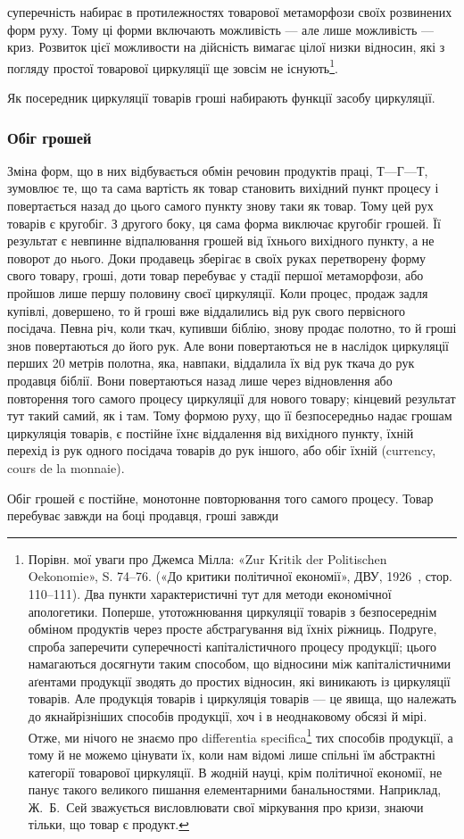 \parcont{}  %
суперечність набирає в протилежностях товарової метаморфози
своїх розвинених форм руху. Тому ці форми включають можливість
— але лише можливість — криз. Розвиток цієї можливости
на дійсність вимагає цілої низки відносин, які з погляду простої
товарової циркуляції ще зовсім не існують\footnote{
Порівн. мої уваги про Джемса Мілла: «Zur Kritik der Politischen
Oekonomie», S. 74--76. («До критики політичної економії», ДВУ, 1926~,
стор. 110--111). Два пункти характеристичні тут для методи економічної
апологетики. Поперше, утотожнювання циркуляції товарів з безпосереднім
обміном продуктів через просте абстрагування від їхніх ріжниць.
Подруге, спроба заперечити суперечності капіталістичного процесу продукції;
цього намагаються досягнути таким способом, що відносини між
капіталістичними аґентами продукції зводять до простих відносин, які
виникають із циркуляції товарів. Але продукція товарів і циркуляція
товарів — це явища, що належать до якнайрізніших способів продукції,
хоч і в неоднаковому обсязі й мірі. Отже, ми нічого не знаємо про differentia
specifica\footnote*{
характеристичні особливості. \emph{Ред.}
} тих способів продукції, а тому й не можемо цінувати їх,
коли нам відомі лише спільні їм абстрактні категорії товарової циркуляції.
В жодній науці, крім політичної економії, не панує такого великого
пишання елементарними банальностями. Наприклад, Ж.~Б.~Сей зважується
висловлювати свої міркування про кризи, знаючи тільки, що товар
є продукт.
}.

Як посередник циркуляції товарів гроші набирають функції
засобу циркуляції.

\subsubsection{Обіг грошей}

Зміна форм, що в них відбувається обмін речовин продуктів
праці, $Т — Г — Т$, зумовлює те, що та сама вартість як товар
становить вихідний пункт процесу і повертається назад до цього
самого пункту знову таки як товар. Тому цей рух товарів є кругобіг.
З другого боку, ця сама форма виключає кругобіг грошей.
Її результат є невпинне відпалювання грошей від їхнього вихідного
пункту, а не поворот до нього. Доки продавець зберігає
в своїх руках перетворену форму свого товару, гроші, доти
товар перебуває у стадії першої метаморфози, або пройшов лише
першу половину своєї циркуляції. Коли процес, продаж задля
купівлі, довершено, то й гроші вже віддалились від рук свого
первісного посідача. Певна річ, коли ткач, купивши біблію,
знову продає полотно, то й гроші знов повертаються до його рук.
Але вони повертаються не в наслідок циркуляції перших
20 метрів полотна, яка, навпаки, віддалила їх від рук ткача
до рук продавця біблії. Вони повертаються назад лише через
відновлення або повторення того самого процесу циркуляції
для нового товару; кінцевий результат тут такий самий, як
і там. Тому формою руху, що її безпосередньо надає грошам
циркуляція товарів, є постійне їхнє віддалення від вихідного
пункту, їхній перехід із рук одного посідача товарів до рук
іншого, або обіг їхній (currency, cours de la monnaie).

Обіг грошей є постійне, монотонне повторювання того самого
процесу. Товар перебуває завжди на боці продавця, гроші завжди
\parbreak{}  %

